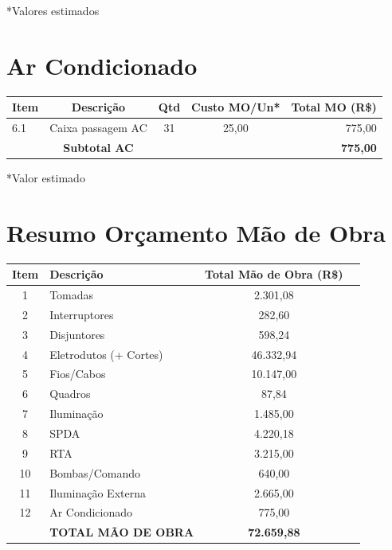 \documentclass[12pt,a4paper]{article}
\renewenvironment{table}%
{\begin{center}%
\scriptsize%
\addtolength{\tabcolsep}{-2pt}%
}%
{\end{center}}
\begin{document}
\noindent\small{*Valores estimados}

\section{Ar Condicionado}

\begin{table}
\centering
\begin{tabular}{lcccr}
\toprule
\textbf{Item} & \textbf{Descrição} & \textbf{Qtd} & \textbf{Custo MO/Un*} & \textbf{Total MO (R\$)} \\
\midrule
6.1 & Caixa passagem AC & 31 & 25,00 & 775,00 \\
\midrule
 & \textbf{Subtotal AC} & & & \textbf{775,00} \\
\bottomrule
\end{tabular}
\end{table}

\noindent\small{*Valor estimado}

\pagebreak

\section{Resumo Orçamento Mão de Obra}

\begin{table}
\centering
\begin{tabular}{clcr}
\toprule
\textbf{Item} & \textbf{Descrição} & \textbf{Total Mão de Obra (R\$)} \\
\midrule
1 & Tomadas & 2.301,08 \\
2 & Interruptores & 282,60 \\
3 & Disjuntores & 598,24 \\
4 & Eletrodutos (+ Cortes) & 46.332,94 \\
5 & Fios/Cabos & 10.147,00 \\
6 & Quadros & 87,84 \\
7 & Iluminação & 1.485,00 \\
8 & SPDA & 4.220,18 \\
9 & RTA & 3.215,00 \\
10 & Bombas/Comando & 640,00 \\
11 & Iluminação Externa & 2.665,00 \\
12 & Ar Condicionado & 775,00 \\
\midrule
 & \textbf{TOTAL MÃO DE OBRA} & \textbf{72.659,88} \\
\bottomrule
\end{tabular}
\end{table}
\end{document}

